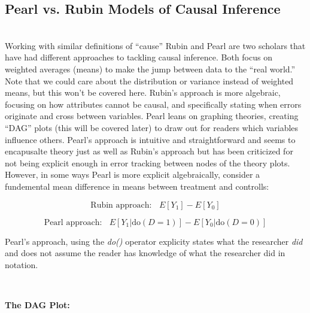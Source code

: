 \documentclass[12pt]{article}\usepackage[]{graphicx}\usepackage[]{color}
\begin{document}
\begin{flushleft}
\clearpage

\subsection{Pearl vs. Rubin Models of Causal Inference}
\hfill \\

Working with similar definitions of ``cause'' Rubin and Pearl are two scholars that have had different approaches to tackling causal inference. Both focus on weighted averages (means) to make the jump between data to the ``real world.'' Note that we could care about the distribution or variance instead of weighted means, but this won't be covered here. Rubin's approach is more algebraic, focusing on how attributes cannot be causal, and specifically stating when errors originate and cross between variables. Pearl leans on graphing theories, creating ``DAG'' plots (this will be covered later) to draw out for readers which variables influence others. Pearl's approach is intuitive and straightforward and seems to encapusalte theory just as well as Rubin's approach but has been criticized for not being explicit enough in error tracking between nodes of the theory plots. However, in some ways Pearl is more explicit algebraically, consider a fundemental mean difference in means between treatment and controlls:

\begin{equation}
\text{Rubin approach:} ~~~~ E[Y_1] - E[Y_0]
\end{equation}

\begin{equation}
\text{Pearl approach:} ~~~~ E[Y_1 | \text{do}(D=1)] - E[Y_0 | \text{do}(D=0)]
\end{equation}

Pearl's approach, using the \textit{do()} operator explicity states what the researcher \textit{did} and does not assume the reader has knowledge of what the researcher did in notation.


\hfill \\
\noindent \textbf{The DAG Plot:}
\hfill \\

\begin{center}


\end{center}
\end{flushleft}
\end{document}

